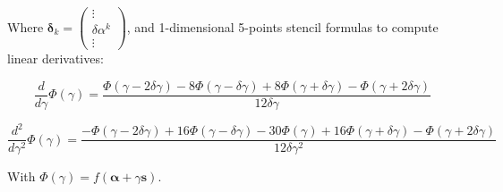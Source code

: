 Where $\bm{\delta}_k=\begin{pmatrix} \vdots \\ \delta\alpha^k \\ \vdots \end{pmatrix}$, and 1-dimensional 5-points stencil formulas to compute linear derivatives:

\begin{equation}
  \dfrac{d}{d\gamma}\Phi(\gamma)=\dfrac{\Phi(\gamma-2\delta\gamma)-8\Phi(\gamma-\delta\gamma)+8\Phi(\gamma+\delta\gamma)-\Phi(\gamma+2\delta\gamma)}{12\delta\gamma}
\end{equation}

\begin{equation}
  \dfrac{d^2}{d\gamma^2}\Phi(\gamma)=\dfrac{-\Phi(\gamma-2\delta\gamma)+16\Phi(\gamma-\delta\gamma)-30\Phi(\gamma)+16\Phi(\gamma+\delta\gamma)-\Phi(\gamma+2\delta\gamma)}{12\delta\gamma^2}
\end{equation}

With $\Phi(\gamma)=f(\bm{\alpha}+\gamma\bm{s})$.
